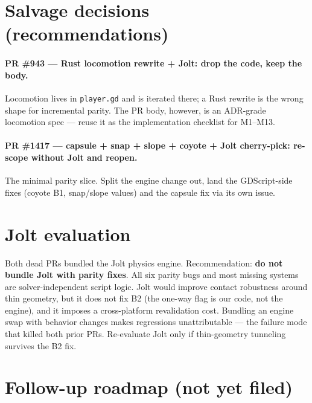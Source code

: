 \documentclass[11pt]{article}
\newcommand{\code}[1]{\texttt{\small #1}}
\begin{document}
\section{Salvage decisions (recommendations)}

\paragraph{PR \#943 --- Rust locomotion rewrite + Jolt: drop the code, keep the body.}
Locomotion lives in \code{player.gd} and is iterated there; a Rust rewrite is the wrong
shape for incremental parity. The PR body, however, is an ADR-grade locomotion spec ---
reuse it as the implementation checklist for M1--M13.

\paragraph{PR \#1417 --- capsule + snap + slope + coyote + Jolt cherry-pick: re-scope
without Jolt and reopen.} The minimal parity slice. Split the engine change out, land the
GDScript-side fixes (coyote B1, snap/slope values) and the capsule fix via its own issue.

\section{Jolt evaluation}

Both dead PRs bundled the Jolt physics engine. Recommendation: \textbf{do not bundle Jolt
with parity fixes}. All six parity bugs and most missing systems are solver-independent
script logic. Jolt would improve contact robustness around thin geometry, but it does not
fix B2 (the one-way flag is our code, not the engine), and it imposes a cross-platform
revalidation cost. Bundling an engine swap with behavior changes makes regressions
unattributable --- the failure mode that killed both prior PRs. Re-evaluate Jolt only if
thin-geometry tunneling survives the B2 fix.

\section{Follow-up roadmap (not yet filed)}
\end{document}
